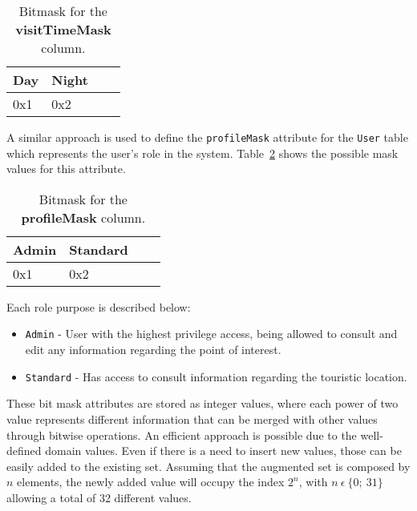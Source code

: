 \begin{center}
\begin{table}
	\centering
    \caption{Bitmask for the \textbf{visitTimeMask} column.}
    \label{tab:bitTimeSeasonMask}
   \begin{tabular}{| >{\centering\arraybackslash}m{3.9cm} | >{\centering\arraybackslash}m{3.9cm} |>{\centering\arraybackslash}m{3.9cm} | >{\centering\arraybackslash}m{3.9cm} |}
    \hline
	Day & Night\\ \hline    
	0x1 & 0x2 \\ \hline
    \end{tabular}
    \end{table}
\end{center}
A similar approach is used to define the \verb"profileMask" attribute for the \verb"User" table which represents the user's role in the system. Table~\ref{tab:bitProfileMask} shows the possible mask values for this attribute.
\begin{center}
\begin{table}
	\centering
    \caption{Bitmask for the \textbf{profileMask} column.}
    \label{tab:bitProfileMask}
   \begin{tabular}{| >{\centering\arraybackslash}m{3.9cm} | >{\centering\arraybackslash}m{3.9cm} |>{\centering\arraybackslash}m{3.9cm} | >{\centering\arraybackslash}m{3.9cm} |}
    \hline
	Admin & Standard \\ \hline    
	0x1 & 0x2 \\ \hline
    \end{tabular}
    \end{table}
\end{center}
Each role purpose is described below:
\begin{itemize}
\item \verb"Admin" - User with the highest privilege access, being allowed to consult and edit any information regarding the point of interest.
\item \verb"Standard" - Has access to consult information regarding the touristic location.
\end{itemize}
These bit mask attributes are stored as integer values, where each power of two value represents different information that can be merged with other values through bitwise operations. An efficient approach is possible due to the well-defined domain values. Even if there is a need to insert new values, those can be easily added to the existing set. Assuming that the augmented set is composed by $n$ elements, the newly added value will occupy the index $2^n$, with $n~\epsilon~\{0;~31\}$ allowing a total of 32 different values.\\
